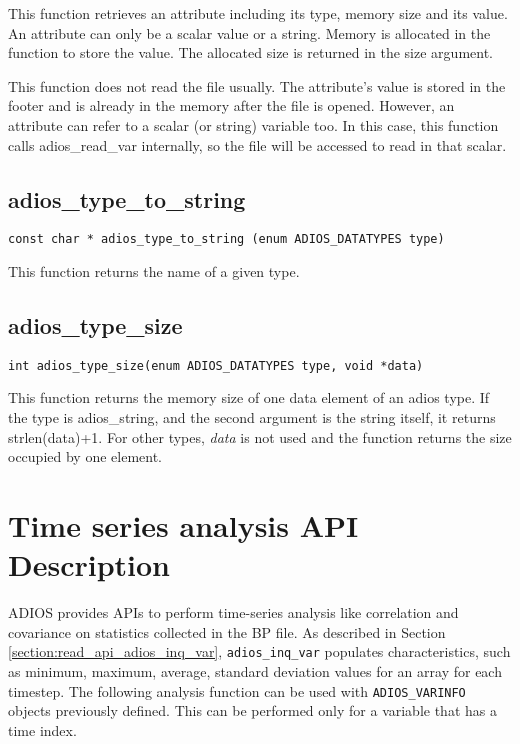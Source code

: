 This function retrieves an attribute including its type, memory size and its value. 
An attribute can only be a scalar value or a string. Memory is allocated in the 
function to store the value. The allocated size is returned in the size argument. 

This function does not read the file usually. The attribute's value is stored in 
the footer and is already in the memory after the file is opened. However, an attribute 
can refer to a scalar (or string) variable too. In this case, this function calls 
adios\_read\_var internally, so the file will be accessed to read in that scalar. 


\subsection{adios\_type\_to\_string}

\begin{lstlisting}[]
const char * adios_type_to_string (enum ADIOS_DATATYPES type)
\end{lstlisting}

This function returns the name of a given type.

\subsection{adios\_type\_size}

\begin{lstlisting}[]
int adios_type_size(enum ADIOS_DATATYPES type, void *data)
\end{lstlisting}

This function returns the memory size of one data element of an adios type. If 
the type is adios\_string, and the second argument is the string itself, it returns 
strlen(data)+1. For other types, \textit{data} is not used and the function returns 
the size occupied by one element.

\section{Time series analysis API Description}

ADIOS provides APIs to perform time-series analysis like correlation and covariance 
on statistics collected in the BP file. As described in Section \ref{section:read_api_adios_inq_var}, \verb+adios_inq_var+ 
populates characteristics, such as minimum, maximum, average, standard deviation 
values for an array for each timestep. The following analysis function can be used 
with \verb+ADIOS_VARINFO+ objects previously defined. This can be performed only for 
a variable that has a time index.

